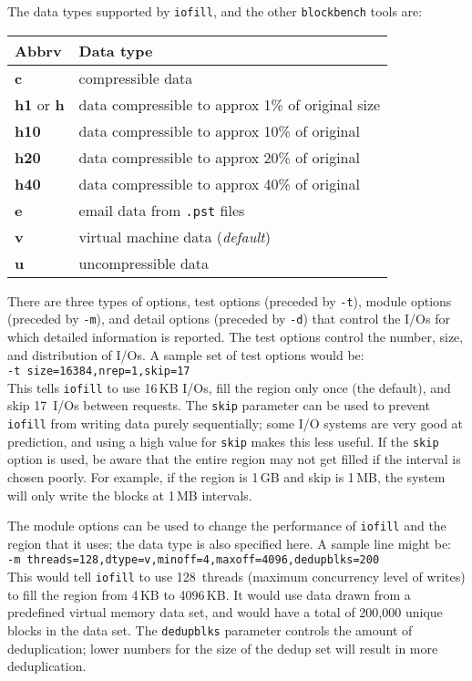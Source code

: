\documentclass[letterpaper,11pt]{article}
\newcommand{\blockbench}{\texttt{blockbench}\xspace}
\newcommand{\iofill}{\texttt{iofill}\xspace}
\begin{document}
The data types supported by \iofill, and the other \blockbench tools are:

\begin{tabular}{|l|l|} \hline
\textbf{Abbrv}             & \textbf{Data type} \\ \hline \hline
\textbf{c}                 & compressible data \\ \hline
\textbf{h1} or \textbf{h}  & data compressible to approx 1\% of original size \\ \hline
\textbf{h10}               & data compressible to approx 10\% of original \\ \hline
\textbf{h20}               & data compressible to approx 20\% of original \\ \hline
\textbf{h40}               & data compressible to approx 40\% of original \\ \hline
\textbf{e}                 & email data from \texttt{.pst} files \\ \hline
\textbf{v}                 & virtual machine data (\emph{default}) \\ \hline
\textbf{u}                 & uncompressible data \\ \hline
\end{tabular}

There are three types of options, test options (preceded by \verb+-t+), module options
(preceded by \verb+-m+), and detail options (preceded by \verb+-d+) that control the
I/Os for which detailed information is reported.  The test options control the number,
size, and distribution of I/Os.  A sample set of test options would be: \\
\verb+-t size=16384,nrep=1,skip=17+ \\
This tells \iofill to use 16\,KB I/Os, fill the region only once (the default), and skip
17~I/Os between requests.  The \verb+skip+ parameter can be used to prevent \iofill from
writing data purely sequentially; some I/O systems are very good at prediction, and using
a high value for \verb+skip+ makes this less useful.  If the \verb+skip+ option is used,
be aware that the entire region may not get filled if the interval is chosen poorly.  For
example, if the region is 1\,GB and skip is 1\,MB, the system will only write the blocks at
1\,MB intervals.

The module options can be used to change the performance of \iofill and the region that it
uses; the data type is also specified here.  A sample line might be:
\\ \verb+-m threads=128,dtype=v,minoff=4,maxoff=4096,dedupblks=200+ \\ This would tell
\iofill to use 128~threads (maximum concurrency level of writes) to fill the region from
4\,KB to 4096\,KB.  It would use data drawn from a predefined virtual memory data set, and
would have a total of 200,000 unique blocks in the data set.  The \verb+dedupblks+
parameter controls the amount of deduplication; lower numbers for the size of the dedup
set will result in more deduplication.
\end{document}
